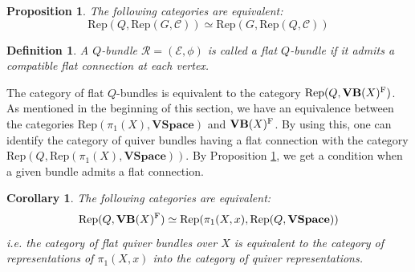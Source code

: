 \documentclass[12pt, reqno]{amsart}
\theoremstyle{plain}
\newtheorem{definition}[theorem]{Definition}
\newtheorem{proposition}[theorem]{Proposition}
\newtheorem{cor}[theorem]{Corollary}
\numberwithin{equation}{section}
\newcommand{\E}{\mathcal{E}}
\begin{document}
\begin{proposition}\label{Rep=Flatconn}
    The following categories are equivalent:
    $$\mathrm{Rep}(Q,\mathrm{Rep}(G,\mathcal{C})) \simeq \mathrm{Rep}(G,\mathrm{Rep}(Q,\mathcal{C}))$$
\end{proposition}

\begin{definition}
\rm    A $Q$-bundle $\mathcal{R}=(\E,\phi)$ is called a \emph{flat $Q$-bundle} if it admits a compatible flat connection at each vertex. 
\end{definition}

The category of flat $Q$-bundles is equivalent to the category
$\mathrm{Rep}(Q,\mathbf{VB}(X)^{\rm F})$.
 As mentioned in the beginning of this section, we have an equivalence between the categories $\mathrm{Rep}(\pi_1(X), \mathbf{VSpace})$ and $\mathbf{VB}(X)^{\rm F}$. By using this, one can identify the category of quiver bundles having a flat connection with the category $\mathrm{Rep}(Q,\mathrm{Rep}(\pi_1(X),\mathbf{VSpace}))$. By Proposition \ref{Rep=Flatconn}, we get a condition when a given bundle admits a flat connection.

\begin{cor}\label{cor}
    The following categories are equivalent:
    $$\mathrm{Rep}(Q,\mathbf{VB}(X)^{\rm F})\simeq \mathrm{Rep}(\pi_1(X,x),\mathrm{Rep}(Q,\mathbf{VSpace}))$$
    i.e. the category of flat quiver bundles over 
$X$ is equivalent to the category of representations of 
$\pi_1(X,x)$ into the category of quiver representations.
\end{cor}







\end{document}

